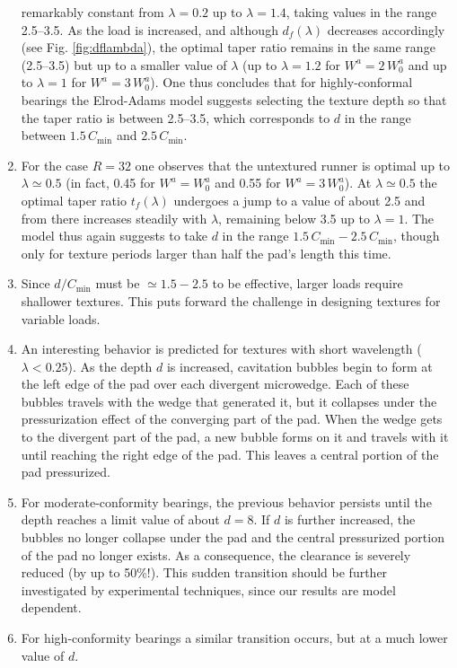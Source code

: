 \begin{enumerate}
remarkably constant from $\lambda=0.2$ up to $\lambda=1.4$,
taking values in the range 2.5--3.5. As the load is increased,
and although $d_f(\lambda)$ decreases accordingly (see Fig. \ref{fig:dflambda}),
the optimal taper ratio remains in the same range (2.5--3.5) but
up to a smaller value of $\lambda$ (up to $\lambda=1.2$ for
$W^a=2\,W^a_0$ and up to $\lambda=1$ for $W^a=3\,W^a_0$). One
thus concludes that for highly-conformal bearings the Elrod-Adams
model suggests selecting the texture depth so that the taper ratio
is between 2.5--3.5, which corresponds to $d$ in the range
between $1.5\,C_{\min}$ and $2.5\,C_{\min}$.
\item For the case $R=32$ one observes that the untextured runner
is optimal up to $\lambda\simeq 0.5$ (in fact, 0.45 for 
$W^a=W^a_0$ and 0.55 for $W^a=3\,W^a_0$). At $\lambda \simeq 0.5$ 
the optimal taper ratio $t_f(\lambda)$
undergoes a jump to a value of about 2.5 and from there increases
steadily with $\lambda$, remaining below 3.5 up to $\lambda=1$.
The model thus again suggests to take $d$ in the range
$1.5\,C_{\min}-2.5\,C_{\min}$, though only for texture periods larger
than half the pad's length this time.
\item Since $d/C_{\min}$ must be $\simeq 1.5 - 2.5$ to be effective, larger loads 
require shallower textures. This puts forward the challenge in 
designing textures for variable loads.
\item An interesting behavior is predicted for textures
with short wavelength ($\lambda < 0.25$). As the depth $d$
is increased, cavitation bubbles begin to form at the left
edge of the pad over each divergent microwedge. Each of these bubbles
travels with the wedge that generated it, but it collapses under
the pressurization effect of the converging part of the pad.
When the wedge gets to the divergent part of the pad, a new bubble
forms on it and travels with it until reaching the right edge of
the pad. This leaves a central portion of the pad pressurized.
\item For moderate-conformity bearings, the previous behavior
persists until the depth reaches a limit value of about $d=8$.
If $d$ is further increased, the bubbles no longer collapse
under the pad and the central pressurized portion of the pad
no longer exists. As a consequence, the clearance is severely
reduced (by up to 50\%!). This sudden transition should be
further investigated by experimental techniques, since our
results are model dependent.
\item For high-conformity bearings a similar transition occurs,
but at a much lower value of $d$.
\end{enumerate}


